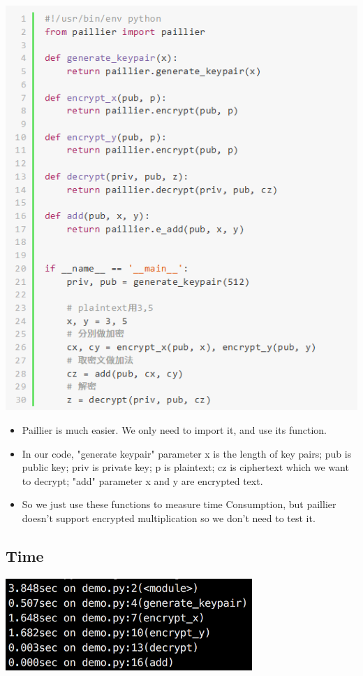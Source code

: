 \documentclass{article}
\begin{document}
\centerline{\includegraphics[width=1\textwidth]{pailliercode.png}}
\begin{itemize}
\item Paillier is much easier. We only need to import it, and use its function.
\item In our code, "generate keypair" parameter x is the length of key pairs; pub is public key; priv is private key; p is plaintext; cz is ciphertext which we want to decrypt; "add" parameter x and y are encrypted text.
\item So we just use these functions to measure time Consumption, but paillier doesn't support encrypted multiplication so we don't need to test it.
\end{itemize}

\subsection{Time}

\centerline{\includegraphics[width=0.70\textwidth]{pailliertime.png}}
\end{document}
